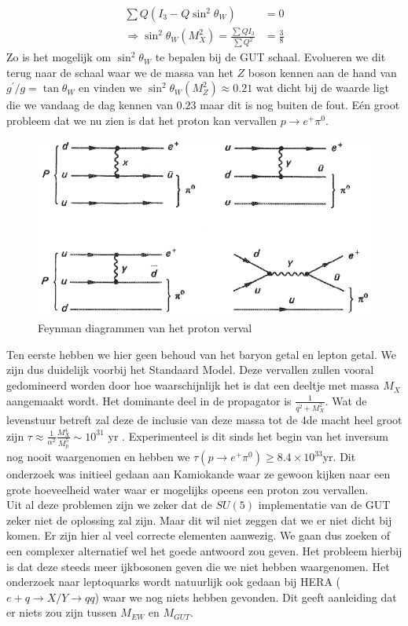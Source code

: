 \documentclass[../main.tex]{subfiles}
\begin{document}
\begin{equation}
    \begin{aligned}
        \label{eq:z_to_gamma_gut}
        \sum Q\left(I_{3}-Q \sin ^{2} \theta_{W}\right) &=0 \\
        \Rightarrow \sin ^{2} \theta_{W}\left(M_{X}^{2}\right)=\frac{\sum Q I_{3}}{\sum Q^{2}} &=\frac{3}{8}
    \end{aligned}
\end{equation}
Zo is het mogelijk om $\sin^2\theta_W$ te bepalen bij de GUT schaal. Evolueren we dit terug naar de schaal waar we de massa van het $Z$ boson kennen aan de hand van $g^{\prime} / g=\tan \theta_{W}$ en vinden we $\sin ^{2} \theta_{W}\left(M_{Z}^{2}\right) \approx 0.21$ wat dicht bij de waarde ligt die we vandaag de dag kennen van $0.23$ maar dit is nog buiten de fout. Eén groot probleem dat we nu zien is dat het proton kan vervallen $p \rightarrow e^{+} \pi^{0}$.

\begin{figure}[h]
    \centering
    \includegraphics[width=0.6\linewidth]{physics_beyond_the_standard_model/proton_verval.png}
    \caption{Feynman diagrammen van het proton verval}%
    \label{fig:physics_beyond_the_standard_model/proton_verval}
\end{figure}

Ten eerste hebben we hier geen behoud van het baryon getal en lepton getal. We zijn dus duidelijk voorbij het Standaard Model. Deze vervallen zullen vooral gedomineerd worden door hoe waarschijnlijk het is dat een deeltje met massa $M_X$ aangemaakt wordt. Het dominante deel in de propagator is $\frac{1}{q^{2}+M_{X}^{2}}$. Wat de levenstuur betreft zal deze de inclusie van deze massa tot de 4de macht heel groot zijn $\tau \approx \frac{1}{\alpha^{2}} \frac{M_{X}^{4}}{M_{p}^{5}} \sim 10^{31} \text { yr }$. Experimenteel is dit sinds het begin van het inversum nog nooit waargenomen en hebben we $\tau\left(p \rightarrow e^{+} \pi^{0}\right) \geq 8.4 \times 10^{33} \text{yr}$. Dit onderzoek was initieel gedaan aan Kamiokande waar ze gewoon kijken naar een grote hoeveelheid water waar er mogelijks opeens een proton zou vervallen.\\
Uit al deze problemen zijn we zeker dat de $SU(5)$ implementatie van de GUT zeker niet de oplossing zal zijn. Maar dit wil niet zeggen dat we er niet dicht bij komen. Er zijn hier al veel correcte elementen aanwezig. We gaan dus zoeken of een complexer alternatief wel het goede antwoord zou geven. Het probleem hierbij is dat deze steeds meer ijkbosonen geven die we niet hebben waargenomen. Het onderzoek naar leptoquarks wordt natuurlijk ook gedaan bij HERA ($e+q \rightarrow X / Y \rightarrow q q$) waar we nog niets hebben gevonden. Dit geeft aanleiding dat er niets zou zijn tussen $M_{EW}$ en $M_{GUT}$.
\end{document}
